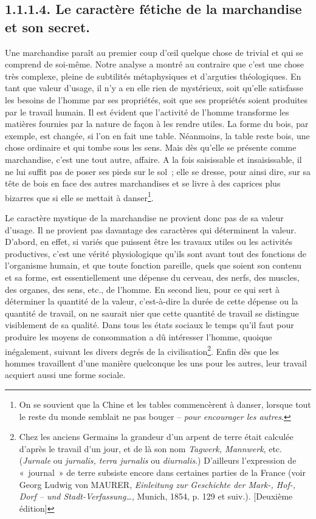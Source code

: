 \documentclass[french,twoside]{book} %
\begin{document}
\subsection[{1.1.1.4. Le caractère fétiche de la marchandise et son secret.}]{1.1.1.4. Le caractère fétiche de la marchandise et son secret.}
\noindent Une marchandise paraît au premier coup d’œil quelque chose de trivial et qui se comprend de soi-même. Notre analyse a montré au contraire que c’est une chose très complexe, pleine de subtilités métaphysiques et d’arguties théologiques. En tant que valeur d’usage, il n’y a en elle rien de mystérieux, soit qu’elle satisfasse les besoins de l’homme par ses propriétés, soit que ses propriétés soient produites par le travail humain. Il est évident que l’activité de l’homme transforme les matières fournies par la nature de façon à les rendre utiles. La forme du bois, par exemple, est changée, si l’on en fait une table. Néanmoins, la table reste bois, une chose ordinaire et qui tombe sous les sens. Mais dès qu’elle se présente comme marchandise, c’est une tout autre, affaire. A la fois saisissable et insaisissable, il ne lui suffit pas de poser ses pieds sur le sol ; elle se dresse, pour ainsi dire, sur sa tête de bois en face des autres marchandises et se livre à des caprices plus bizarres que si elle se mettait à danser\footnote{On se souvient que la Chine et les tables commencèrent à danser, lorsque tout le reste du monde semblait ne pas bouger – \emph{pour encourager les autres}.}.\par
Le caractère mystique de la marchandise ne provient donc pas de sa valeur d’usage. Il ne provient pas davantage des caractères qui déterminent la valeur. D’abord, en effet, si variés que puissent être les travaux utiles ou les activités productives, c’est une vérité physiologique qu’ils sont avant tout des fonctions de l’organisme humain, et que toute fonction pareille, quels que soient son contenu et sa forme, est essentiellement une dépense du cerveau, des nerfs, des muscles, des organes, des sens, etc., de l’homme. En second lieu, pour ce qui sert à déterminer la quantité de la valeur, c’est-à-dire la durée de cette dépense ou la quantité de travail, on ne saurait nier que cette quantité de travail se distingue visiblement de sa qualité. Dans tous les états sociaux le temps qu’il faut pour produire les moyens de consommation a dû intéresser l’homme, quoique inégalement, suivant les divers degrés de la civilisation\footnote{Chez les anciens Germains la grandeur d’un arpent de terre était calculée d’après le travail d’un jour, et de là son nom \emph{Tagwerk, Mannwerk}, etc. (\emph{Jurnale} ou \emph{jurnalis, terra jurnalis} ou \emph{diurnalis}.) D’ailleurs l’expression de « journal » de terre subsiste encore dans certaines parties de la France (voir Georg Ludwig von MAURER, \emph{Einleitung zur Geschichte der Mark-, Hof-, Dorf – und Stadt-Verfassung…}, Munich, 1854, p. 129 et suiv.). [Deuxième édition]}. Enfin dès que les hommes travaillent d’une manière quelconque les uns pour les autres, leur travail acquiert aussi une forme sociale.\par
\end{document}
